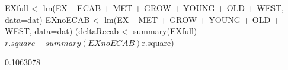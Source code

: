 \begin{Schunk}
\begin{Sinput}
 EXfull <- lm(EX ~ ECAB + MET + GROW + YOUNG + OLD + WEST, data=dat)
 EXnoECAB <- lm(EX ~ MET + GROW + YOUNG + OLD + WEST, data=dat)
 (deltaRecab <- summary(EXfull)$r.square - summary(EXnoECAB)$r.square)
\end{Sinput}
\begin{Soutput}
[1] 0.1063078
\end{Soutput}
\end{Schunk}
